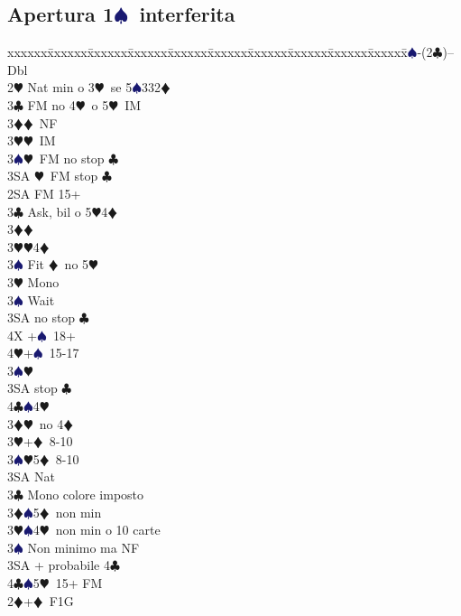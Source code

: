\documentclass[a4paper,italian]{article}
\newcommand{\BC}{\textcolor{OliveGreen}{$\clubsuit$}}
\newcommand{\BD}{\textcolor{RedOrange}{$\vardiamondsuit$}}
\newcommand{\BH}{\textcolor{Red2}{$\varheartsuit${}}}
\newcommand{\BS}{\textcolor{MidnightBlue}{$\spadesuit${}}}
\newcommand{\pdfs}{\texorpdfstring{\BS{}}{S}}
\newenvironment{bidtable}
{\begin{tabbing}

    xxxxxx\=xxxxxx\=xxxxxx\=xxxxxx\=xxxxxx\=xxxxxx\=xxxxxx\=xxxxxx\=xxxxxx\=xxxxxx\=\kill}
{\end{tabbing} }%
\begin{document}
\begin{multicols}{2}
    \subsection{Apertura 1\pdfs\ interferita}

    \begin{bidtable}
        1\BS-(2\BC)--\+\\
        Dbl\+\\
        2\BH \> Nat min o 3\BH\ se 5\BS332\BD\+\\
        3\BC \> FM no 4\BH\ o 5\BH\ IM\\
        3\BD {}\BD\ NF\\
        3\BH {}\BH\ IM\\
        3\BS {}\BH\ FM no stop \BC \\
        3SA \BH\ FM stop \BC \-\\
        2SA \> FM 15+\+\\
        3\BC \> Ask, bil o 5\BH4\BD\+\\
        3\BD {}\BD \+\\
        3\BH {}\BH 4\BD \\
        3\BS \> Fit \BD\ no 5\BH \-\\
        3\BH \> Mono\+\\
        3\BS \> Wait\+\\
        3SA  no stop \BC \\
        4X +\BS\ 18+\\
        4\BH {}+\BS\ 15-17\-\-\\
        3\BS {}\BH\\
        3SA  stop \BC \\
        4\BC {}\BS 4\BH \-\\
        3\BD {}\BH\ no 4\BD \\
        3\BH {}+\BD\ 8-10\\
        3\BS {}\BH 5\BD\ 8-10\\
        3SA \> Nat\-\\
        3\BC \> Mono colore imposto\\
        3\BD {}\BS 5\BD\ non min\\
        3\BH {}\BS 4\BH\ non min o 10 carte \\
        3\BS \> Non minimo ma NF\\
        3SA + probabile 4\BC \\
        4\BC {}\BS 5\BH\ 15+ FM \-\\
        2\BD {}+\BD\ F1G\\

\end{bidtable}
\end{multicols}
\end{document}
